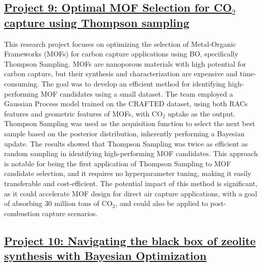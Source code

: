  \subsection*{\href{https://youtu.be/l0aVZDMwIMU}{Project 9: Optimal MOF Selection for CO$_2$ capture using Thompson sampling}}

This research project focuses on optimizing the selection of Metal-Organic Frameworks (MOFs) for carbon capture applications using BO, specifically Thompson Sampling. MOFs are nanoporous materials with high potential for carbon capture\cite{furukawa2013chemistry, heo2020metal}, but their synthesis and characterization are expensive and time-consuming\cite{desantis2017techno}. The goal was to develop an efficient method for identifying high-performing MOF candidates using a small dataset. The team employed a Gaussian Process model trained on the CRAFTED dataset\cite{oliveira2023crafted}, using both RACs features and geometric features of MOFs, with CO$_2$ uptake as the output. Thompson Sampling was used as the acquisition function to select the next best sample based on the posterior distribution, inherently performing a Bayesian update. The results showed that Thompson Sampling was twice as efficient as random sampling in identifying high-performing MOF candidates. This approach is notable for being the first application of Thompson Sampling to MOF candidate selection, and it requires no hyperparameter tuning, making it easily transferable and cost-efficient. The potential impact of this method is significant, as it could accelerate MOF design for direct air capture applications, with a goal of absorbing 30 million tons of CO$_2$, and could also be applied to post-combustion capture scenarios.
 \subsection*{\href{https://www.youtube.com/watch?v=4lFEUixwkE8}{Project 10: Navigating the black box of zeolite synthesis with Bayesian Optimization}}

